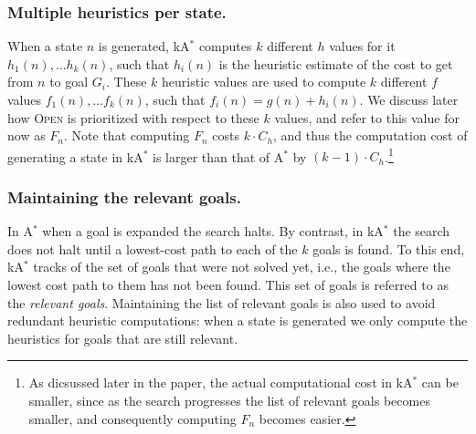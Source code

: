 \documentclass{aicom2e}
\newcommand{\astar}{A$^*$}
\newcommand{\kastar}{kA$^*$}
\newcommand{\open}{\textsc{Open}}
\begin{document}
\subsubsection*{Multiple heuristics per state.} When a state $n$ is generated, \kastar{} computes 
$k$ different $h$ values for it $h_1(n),\ldots h_k(n)$, such that $h_i(n)$ is the heuristic estimate of the cost to get from $n$ to goal $G_i$. These $k$ heuristic values are used to compute $k$ different $f$ values $f_1(n),\ldots f_k(n)$, such that $f_i(n)=g(n)+h_i(n)$. We discuss later how \open{} is prioritized with respect to these $k$ values, and refer to this value for now as $F_n$. Note that computing $F_n$ costs $k\cdot C_h$, and thus the computation cost of generating a state in \kastar{} is larger than that of \astar{} by $(k-1)\cdot C_{h}$.\footnote{As dicsussed later in the paper, the actual computational cost in \kastar{} can be smaller, since as the search progresses the list of relevant goals becomes smaller, and consequently computing $F_n$ becomes easier.}

\subsubsection*{Maintaining the relevant goals.} In \astar{} when a goal is expanded the search halts. By contrast, in \kastar{} the search does not halt until a lowest-cost path to each of the $k$ goals is found. To this end, \kastar{} tracks of the set of goals that were not solved yet, i.e., the goals where the lowest cost path to them has not been found. This set of goals is referred to as the {\em relevant goals}. Maintaining the list of relevant goals is also used to avoid redundant heuristic computations: when a state is generated we only compute the heuristics for goals that are still relevant. 



\end{document}
